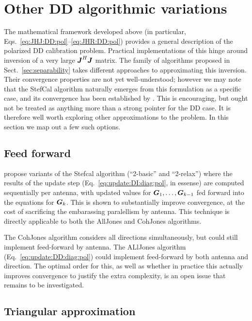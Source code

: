 \documentclass[useAMS,usenatbib]{mn2e}
\newcommand{\mat}[1]{{\bmath{#1}}}
\newcommand{\JJ}{\mat{J}} %
\newcommand{\GG}{\mat{G}}
\newcommand{\JHJ}{\JJ^H\JJ} %
\begin{document}
\section{Other DD algorithmic variations}

The mathematical framework developed above (in particular, Eqs.~\ref{eq:JHJ:DD:pol}--\ref{eq:JHR:DD:pol}) provides
a general description of the polarized DD calibration problem. Practical implementations of this hinge around inversion of
a very large $\JHJ$ matrix. The family of algorithms proposed in Sect.~\ref{sec:separability} takes different approaches
to approximating this inversion. Their convergence properties are not yet well-understood; however we may note that 
the {\sc StefCal} algorithm naturally emerges from this formulation as a specific case, and its convergence has been 
established by \citet{Stefcal}. This is encouraging, but ought not be treated as anything more than a strong pointer for 
the DD case. It is therefore well worth exploring other approximations to the problem. In this section we map out a few 
such options.

\subsection{Feed forward}
\label{sec:feed-forward}

\citet{Stefcal} propose variants of the Stefcal algorithm (``2-basic'' and ``2-relax'') where the results of the 
update step (Eq.~\ref{eq:update:DI:diag:pol}, in essense) are computed sequentially per antenna, with updated
values for $\GG_1,\dots,\GG_{k-1}$ fed forward into the equations for $\GG_k$. This is shown to 
substantially improve convergence, at the cost of sacrificing the embarassing paralellism by antenna. This technique 
is directly applicable to both the {\sc AllJones} and {\sc CohJones} algorithms. 

The {\sc CohJones} algorithm considers all directions simultaneously, but could still implement feed-forward by antenna.
The {\sc ALlJones} algorithm (Eq.~\ref{eq:update:DD:diag:pol}) could implement feed-forward by both antenna and direction. 
The optimal order for this, as well as whether in practice this actually improves convergence to justify the extra 
complexity, is an open issue that remains to be investigated.

\subsection{Triangular approximation}
\end{document}
